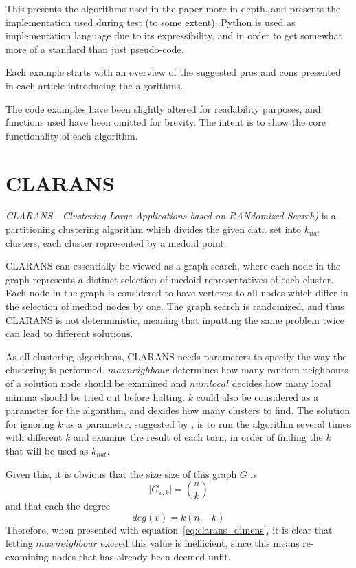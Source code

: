 
This presents the algorithms used in the paper more in-depth, and presents
the implementation used during test (to some extent). Python is used as 
implementation language due to its expressibility, and in order to get 
somewhat more of a standard than just pseudo-code.

Each example starts with an overview of the suggested pros and cons presented
in each article introducing the algorithms. 

The code examples have been slightly altered for readability purposes, and 
functions used have been omitted for brevity. The intent is to show the
core functionality of each algorithm.

\newpage

\section{CLARANS}

\emph{CLARANS - Clustering Large Applications based on RANdomized Search)}
is a partitioning clustering algorithm which divides the given data set 
into $ k_{nat} $ clusters, each cluster represented by a medoid point. 

CLARANS can essentially be viewed as a graph search, where each node in 
the graph represents a distinct selection of medoid representatives of
each cluster. Each node in the graph is considered to have vertexes to 
all nodes which differ in the selection of mediod nodes by one. The graph
search is randomized, and thus CLARANS is not deterministic, meaning that
inputting the same problem twice can lead to different solutions.

As all clustering algorithms, CLARANS needs parameters to specify the way
the clustering is performed. $maxneighbour$ determines how many random
neighbours of a solution node should be examined and $numlocal$ decides
how many local minima should be tried out before halting. $k$ could also
be considered as a parameter for the algorithm, and dexides how many
clusters to find. The solution for ignoring $k$ as a parameter, 
suggested by \citeauthor{CLARANS}, is to run the algorithm several times
with different $k$ and examine the result of each turn, in order of 
finding the $k$ that will be used as $k_{nat}$. 

Given this, it is obvious that the size size of this graph $ G $ is 
\begin{equation}
    \label{eq:clarans_size}
    \mid G_{v,k} \mid = \binom{n}{k}
\end{equation}
and that each the degree
\begin{equation}
    \label{eq:clarans_dimens}
    deg(v) = k(n-k)
\end{equation}
Therefore, when presented with equation~\ref{eq:clarans_dimens}, it is 
clear that letting $maxneighbour$ exceed this value is inefficient, 
since this means re-examining nodes that has already been deemed unfit.

